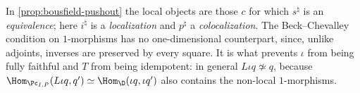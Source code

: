 \begin{rmk}
\label{rmk:2dloc-compare-bousfield}
In \cref{prop:bousfield-pushout} the local objects are those $c$ for which $s^{\natural}$ is an \emph{equivalence}; here $i^{\natural}$ is a \emph{localization} and $p^{\natural}$ a \emph{colocalization}.
The Beck--Chevalley condition on $1$-morphisms has no one-dimensional counterpart, since, unlike adjoints, inverses are preserved by every square.
It is what prevents $\iota$ from being fully faithful and $T$ from being idempotent: in general $L\iota q \not\simeq q$, because $\Hom_{\Pc_{I,P}}(L\iota q,q') \simeq \Hom_{\D}(\iota q,\iota q')$ also contains the non-local $1$-morphisms.
\end{rmk}

